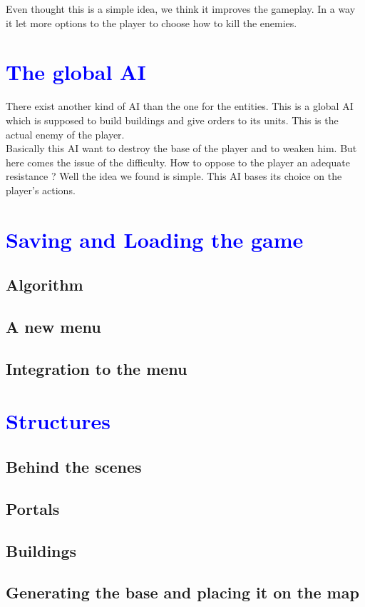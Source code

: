 \documentclass[article]{report}             %
\begin{document}
Even thought this is a simple idea, we think it improves the gameplay. In a way it let more options to the player to choose how to kill the enemies.
		\chapter{\textcolor{blue}{The global AI}}
			There exist another kind of AI than the one for the entities. This is a global AI which is supposed to build buildings and give orders to its units. This is the actual enemy of the player.\\

Basically this AI want to destroy the base of the player and to weaken him. But here comes the issue of the difficulty. How to oppose to the player an adequate resistance ? Well the idea we found is simple. This AI bases its choice on the player's actions. 
		\chapter{\textcolor{blue}{Saving and Loading the game}}
			\section{Algorithm}
			\section{A new menu}
			\section{Integration to the menu}

		\chapter{\textcolor{blue}{Structures}}
			\section{Behind the scenes}
			\section{Portals}
			\section{Buildings}
			\section{Generating the base and placing it on the map}
\end{document}
